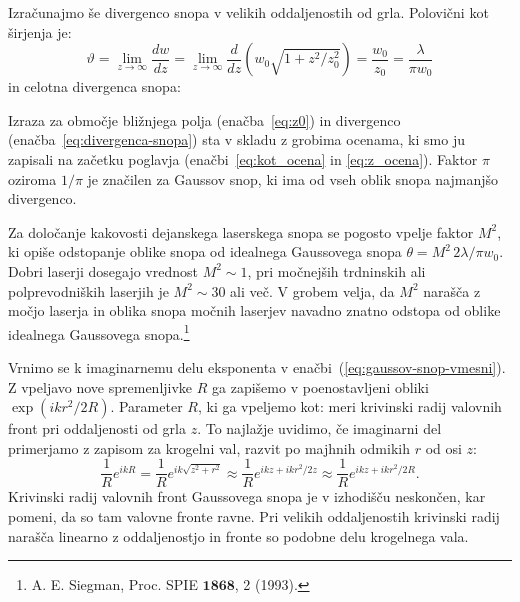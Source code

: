 Izračunajmo še divergenco snopa v velikih oddaljenostih od grla. Polovični kot širjenja je:
\begin{equation}
\vartheta=\lim_{z \to \infty} \frac{dw}{dz} = \lim_{z \to \infty}\frac{d}{dz} \left(w_0\sqrt{1+z^2/z_0^2}\right)=
\frac{w_{0}}{z_{0}}= \frac{\lambda}{\pi w_{0}}\label{eq:divergenca-snopa}
\end{equation}
in celotna divergenca snopa:

Izraza za območje bližnjega polja (enačba~\ref{eq:z0}) in divergenco 
(enačba~\ref{eq:divergenca-snopa}) sta v skladu z grobima ocenama, ki smo ju 
zapisali na začetku poglavja (enačbi~\ref{eq:kot_ocena} in \ref{eq:z_ocena}). Faktor
$\pi$ oziroma $1/\pi$ je značilen za Gaussov snop, ki ima od vseh oblik snopa 
najmanjšo divergenco. 

\begin{remark}
Za določanje kakovosti dejanskega laserskega snopa se pogosto vpelje faktor $M^2$,
ki opiše odstopanje oblike snopa od idealnega Gaussovega snopa 
$\theta = M^2 \, 2\lambda/\pi w_{0}$. 
Dobri laserji dosegajo vrednost $M^2 \sim 1$,
pri močnejših trdninskih ali polprevodniških laserjih je $M^2 \sim 30$ ali več. 
V grobem velja, da $M^2$ narašča z močjo laserja in oblika snopa močnih laserjev navadno znatno
odstopa od oblike idealnega Gaussovega snopa.\footnote{A. E. Siegman, Proc. SPIE $\mathbf{1868}$, 2 (1993).}  
\end{remark}

Vrnimo se k imaginarnemu delu eksponenta v enačbi~(\ref{eq:gaussov-snop-vmesni}). Z
vpeljavo nove spremenljivke $R$ ga zapišemo v poenostavljeni obliki $\exp(ikr^2/2R)$. Parameter $R$, ki 
ga vpeljemo kot:
meri krivinski radij valovnih front 
pri oddaljenosti od grla $z$. To najlažje
uvidimo, če imaginarni del primerjamo z zapisom za krogelni val, razvit 
po majhnih odmikih $r$ od osi $z$:
\begin{equation}
\frac{1}{R}e^{ikR}=\frac{1}{R}e^{ik\sqrt{z^{2}+r^{2}}}\approx \frac{1}{R}e^{ikz+ikr^{2}/2z} \approx \frac{1}{R}e^{ikz+ikr^{2}/2R}.
\label{eq:krogelni-val}
\end{equation}
Krivinski radij valovnih front Gaussovega snopa je v izhodišču neskončen, kar pomeni, da so tam valovne fronte 
ravne. Pri velikih oddaljenostih krivinski radij narašča linearno z oddaljenostjo in fronte
so podobne delu krogelnega vala. 

